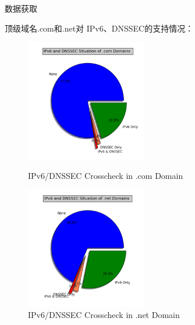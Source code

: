 \documentclass{beamer}
\begin{document}
\begin{frame}{数据获取}

  顶级域名.com和.net对 IPv6、DNSSEC的支持情况：

  \begin{figure}[htbp]
    \centering
    \begin{minipage}[htbp]{150pt}
      \centering
      \includegraphics[width=150pt]{images/figure/figure_1.png}
      \caption{\scriptsize{IPv6/DNSSEC Crosscheck in .com Domain}}
      \label{fig:4}
    \end{minipage}
    \hspace{10pt}%
    \begin{minipage}[htpb]{150pt}
      \centering
      \includegraphics[width=150pt]{images/figure/figure_4.png}
      \caption{\scriptsize{IPv6/DNSSEC Crosscheck in .net Domain}}
      \label{fig:5}
    \end{minipage}
    \end{figure}


\end{frame}
\end{document}
